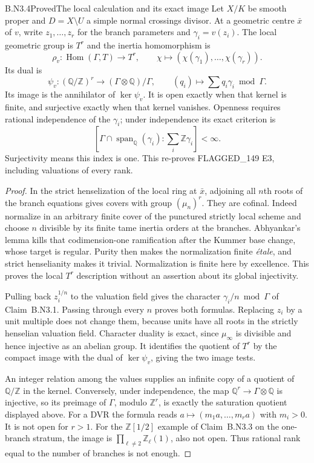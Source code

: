 \begin{claim}{B.N3.4}{Proved}{The local calculation and its exact image}
Let $X/K$ be smooth proper and $D=X\setminus U$ a simple normal
crossings divisor.  At a geometric centre $\bar x$ of $v$, write
$z_1,\ldots,z_r$ for the branch parameters and $\gamma_i=v(z_i)$.
The local geometric group is $T^r$ and the inertia homomorphism is
\[
 \rho_v:\operatorname{Hom}(\Gamma,T)\longrightarrow T^r,
 \qquad\chi\longmapsto(\chi(\gamma_1),\ldots,\chi(\gamma_r)).
\]
Its dual is
\[
 \psi_v:(\mathbb Q/\mathbb Z)^r\longrightarrow
 (\Gamma\otimes\mathbb Q)/\Gamma,
 \qquad(q_i)\longmapsto\sum q_i\gamma_i\bmod\Gamma.
\]
Its image is the annihilator of $\ker\psi_v$.  It is open exactly
when that kernel is finite, and surjective exactly when that kernel
vanishes.  Openness requires rational independence of the
$\gamma_i$; under independence its exact criterion is
\[
 [\Gamma\cap\operatorname{span}_{\mathbb Q}(\gamma_i):
       \textstyle\sum_i\mathbb Z\gamma_i]<\infty.
\]
Surjectivity means this index is one.  This re-proves
FLAGGED\_149 E3, including valuations of every rank.
\end{claim}
\begin{proof}
In the strict henselization of the local ring at $\bar x$, adjoining
all $n$th roots of the branch equations gives covers with group
$(\mu_n)^r$.  They are cofinal.  Indeed normalize in an arbitrary
finite cover of the punctured strictly local scheme and choose $n$
divisible by its finite tame inertia orders at the branches.
Abhyankar's lemma kills that codimension-one ramification after the
Kummer base change, whose target is regular.  Purity then makes the
normalization finite \emph{\'etale}, and strict henselianity makes it
trivial.  Normalization is finite here by excellence.  This proves
the local $T^r$ description without an assertion about its global
injectivity.

Pulling back $z_i^{1/n}$ to the valuation field gives the character
$\gamma_i/n\bmod\Gamma$ of Claim~B.N3.1.  Passing through every
$n$ proves both formulas.  Replacing $z_i$ by a unit multiple does
not change them, because units have all roots in the strictly
henselian valuation field.  Character duality is exact, since
$\mu_\infty$ is divisible and hence injective as an abelian group.
It identifies the quotient of $T^r$ by the compact image with the
dual of $\ker\psi_v$, giving the two image tests.

An integer relation among the values supplies an infinite copy of a
quotient of $\mathbb Q/\mathbb Z$ in the kernel.  Conversely, under
independence, the map $\mathbb Q^r\to\Gamma\otimes\mathbb Q$
is injective, so its preimage of $\Gamma$, modulo $\mathbb Z^r$,
is exactly the saturation quotient displayed above.  For a DVR
the formula reads $a\mapsto(m_1a,\ldots,m_ra)$ with $m_i>0$.
It is not open for $r>1$.  For the $\mathbb Z[1/2]$ example of
Claim~B.N3.3 on the one-branch stratum, the image is
$\prod_{\ell\ne2}\mathbb Z_\ell(1)$, also not open.  Thus
rational rank equal to the number of branches is not enough.
\end{proof}

